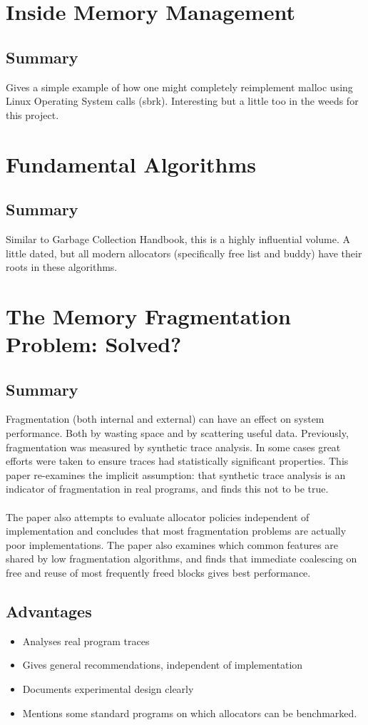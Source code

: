 \documentclass{report}
\begin{document}
\section[IBM Tutorial]{Inside Memory Management}
\subsection{Summary}
Gives a simple example of how one might completely reimplement malloc using Linux Operating System calls (sbrk). Interesting but a little too in the weeds for this project.

\section[Knuth]{Fundamental Algorithms}
\subsection{Summary}
Similar to Garbage Collection Handbook, this is a highly influential volume. A little dated, but all modern allocators (specifically free list and buddy) have their roots in these algorithms.

\section[Fragmentation]{The Memory Fragmentation Problem: Solved? \cite{10.1145/286860.286864}}
\subsection{Summary}
Fragmentation (both internal and external) can have an effect on system performance. Both by wasting space and by scattering useful data. Previously, fragmentation was measured by synthetic trace analysis. In some cases great efforts were taken to ensure traces had statistically significant properties. This paper re-examines the implicit assumption: that synthetic trace analysis is an indicator of fragmentation in real programs, and finds this not to be true.\\
\\
The paper also attempts to evaluate allocator policies independent of implementation and concludes that most fragmentation problems are actually poor implementations. The paper also examines which common features are shared by low fragmentation algorithms, and finds that immediate coalescing on free and reuse of most frequently freed blocks gives best performance.
\subsection{Advantages}
\begin{itemize}
	\item{Analyses real program traces}
	\item{Gives general recommendations, independent of implementation}
	\item{Documents experimental design clearly}
	\item{Mentions some standard programs on which allocators can be benchmarked.}
\end{itemize}
\end{document}
